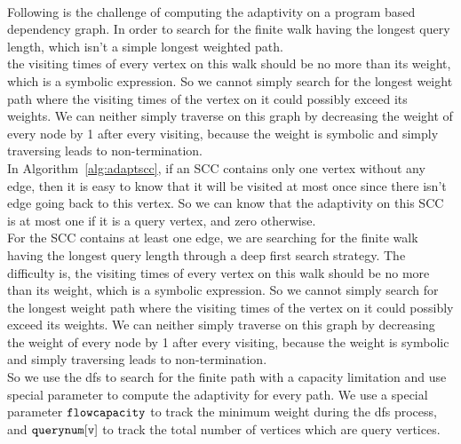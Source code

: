             \\
Following is the challenge of computing the adaptivity on a program based dependency graph.
In order to search for the finite walk having the longest query length, which isn't a simple longest weighted path.
\\
the visiting times of every vertex on this walk should be no more than its weight, which is a symbolic expression.
So we cannot simply search for the longest weight path where the visiting times of the vertex on it could possibly exceed its weights.
We can neither simply traverse on this graph by decreasing the weight of every node by 1 after every visiting,
because the weight is symbolic and simply traversing leads to non-termination.
\\
In Algorithm~\ref{alg:adaptscc}, if an SCC contains only one vertex without any edge, 
then it is easy to know that it will be visited 
at most once since there isn't edge going back to this vertex. 
So we can know that the adaptivity on this SCC is at most one if it is a query vertex,
and zero otherwise.
\\
For the SCC contains at least one edge, we are searching for the finite walk having the longest query length through a deep first search strategy.
The difficulty is, the visiting times of every vertex on this walk should be no more than its weight, which is a symbolic expression.
So we cannot simply search for the longest weight path where the visiting times of the vertex on it could possibly exceed its weights.
We can neither simply traverse on this graph by decreasing the weight of every node by 1 after every visiting,
because the weight is symbolic and simply traversing leads to non-termination.
\\
So we use the dfs to search for the finite path with a capacity limitation and use special parameter to compute the adaptivity
for every path.
We use a special parameter $\mathtt{flowcapacity}$  to track the minimum weight during the dfs process, and $\mathtt{querynum[v]}$
to track the total number of vertices which are query vertices.

